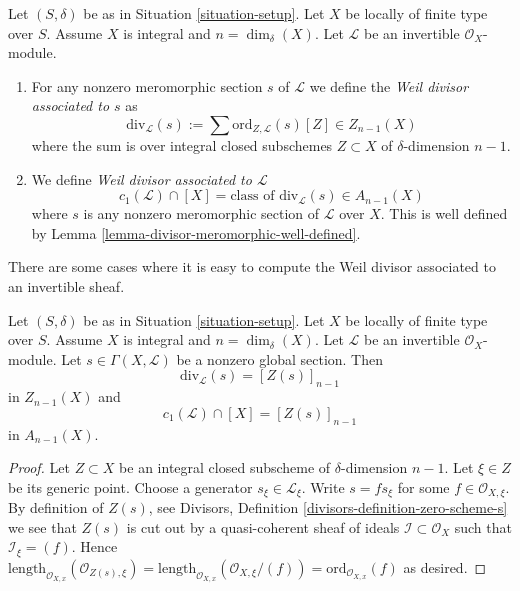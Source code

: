 \begin{definition}
\label{definition-divisor-invertible-sheaf}
Let $(S, \delta)$ be as in Situation \ref{situation-setup}.
Let $X$ be locally of finite type over $S$. Assume $X$ is
integral and $n = \dim_\delta(X)$.
Let $\mathcal{L}$ be an invertible $\mathcal{O}_X$-module.
\begin{enumerate}
\item For any nonzero meromorphic section $s$ of $\mathcal{L}$
we define the {\it Weil divisor associated to $s$} as
$$
\text{div}_\mathcal{L}(s) :=
\sum \text{ord}_{Z, \mathcal{L}}(s) [Z] \in Z_{n - 1}(X)
$$
where the sum is over integral closed subschemes $Z \subset X$
of $\delta$-dimension $n - 1$.
\item We define {\it Weil divisor associated to $\mathcal{L}$}
$$
c_1(\mathcal{L}) \cap [X] =
\text{class of }\text{div}_\mathcal{L}(s) \in A_{n - 1}(X)
$$
where $s$ is any nonzero meromorphic section of $\mathcal{L}$ over
$X$. This is well defined by
Lemma \ref{lemma-divisor-meromorphic-well-defined}.
\end{enumerate}
\end{definition}

\noindent
There are some cases where it is easy to compute the
Weil divisor associated to an invertible sheaf.

\begin{lemma}
\label{lemma-compute-c1}
Let $(S, \delta)$ be as in Situation \ref{situation-setup}.
Let $X$ be locally of finite type over $S$. Assume $X$ is
integral and $n = \dim_\delta(X)$.
Let $\mathcal{L}$ be an invertible $\mathcal{O}_X$-module.
Let $s \in \Gamma(X, \mathcal{L})$ be a nonzero global section.
Then
$$
\text{div}_\mathcal{L}(s) = [Z(s)]_{n - 1}
$$
in $Z_{n - 1}(X)$ and
$$
c_1(\mathcal{L}) \cap [X] = [Z(s)]_{n - 1}
$$
in $A_{n - 1}(X)$.
\end{lemma}

\begin{proof}
Let $Z \subset X$ be an integral closed subscheme of
$\delta$-dimension $n - 1$. Let $\xi \in Z$ be its generic
point. Choose a generator $s_\xi \in \mathcal{L}_\xi$.
Write $s = fs_\xi$ for some $f \in \mathcal{O}_{X, \xi}$.
By definition of $Z(s)$, see
Divisors, Definition \ref{divisors-definition-zero-scheme-s}
we see that $Z(s)$ is cut out by a quasi-coherent
sheaf of ideals $\mathcal{I} \subset \mathcal{O}_X$ such
that $\mathcal{I}_\xi = (f)$. Hence
$\text{length}_{\mathcal{O}_{X, x}}(\mathcal{O}_{Z(s), \xi})
=
\text{length}_{\mathcal{O}_{X, x}}(\mathcal{O}_{X, \xi}/(f))
=
\text{ord}_{\mathcal{O}_{X, x}}(f)$ as desired.
\end{proof}


